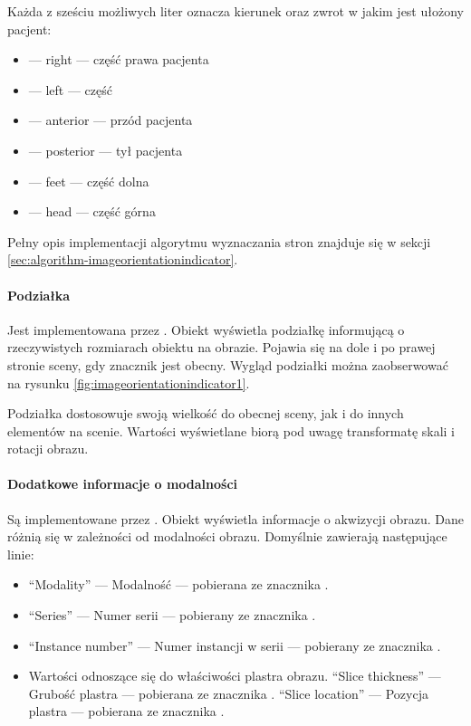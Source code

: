\par
Każda z sześciu możliwych liter oznacza kierunek oraz zwrot w jakim jest ułożony pacjent:
\begin{itemize}
    \item {} --- right --- część prawa pacjenta
    \item {} --- left --- część
    \item {} --- anterior --- przód pacjenta
    \item {} --- posterior --- tył pacjenta
    \item {} --- feet --- część dolna
    \item {} --- head --- część górna
\end{itemize}

\par
Pełny opis implementacji algorytmu wyznaczania stron znajduje się w sekcji \ref{sec:algorithm-imageorientationindicator}.

\paragraph{Podziałka}

Jest implementowana przez .
Obiekt wyświetla podziałkę informującą o rzeczywistych rozmiarach obiektu na obrazie.
Pojawia się na dole i po prawej stronie sceny, gdy znacznik  jest obecny.
Wygląd podziałki można zaobserwować na rysunku \ref{fig:imageorientationindicator1}.

Podziałka dostosowuje swoją wielkość do obecnej sceny, jak i do innych elementów na scenie.
Wartości wyświetlane biorą pod uwagę transformatę skali i rotacji obrazu.

\paragraph{Dodatkowe informacje o modalności}

Są implementowane przez .
Obiekt wyświetla informacje o akwizycji obrazu.
Dane różnią się w zależności od modalności obrazu.
Domyślnie zawierają następujące linie:
\begin{itemize}
    \item \enquote{Modality} --- Modalność --- pobierana ze znacznika .
    \item \enquote{Series} --- Numer serii --- pobierany ze znacznika .
    \item \enquote{Instance number} --- Numer instancji w serii --- pobierany ze znacznika .
    \item Wartości odnoszące się do właściwości plastra obrazu.
          \enquote{Slice thickness} --- Grubość plastra --- pobierana ze znacznika .
          \enquote{Slice location} --- Pozycja plastra --- pobierana ze znacznika .
\end{itemize}

